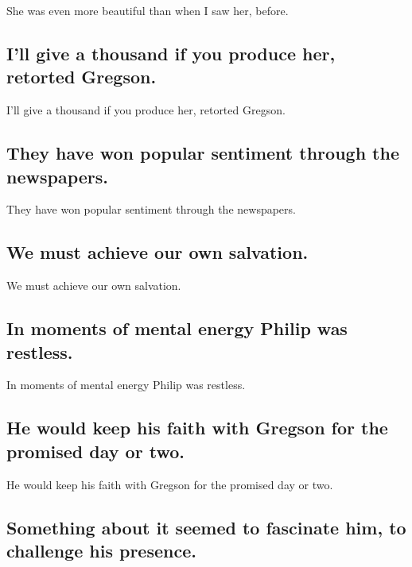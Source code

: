 \documentclass[]{article}
\begin{document}
She was even more beautiful than when I saw her, before.

\hypertarget{ill-give-a-thousand-if-you-produce-her-retorted-gregson.}{%
\subsection{I'll give a thousand if you produce her, retorted
Gregson.}\label{ill-give-a-thousand-if-you-produce-her-retorted-gregson.}}

I'll give a thousand if you produce her, retorted Gregson.

\hypertarget{they-have-won-popular-sentiment-through-the-newspapers.}{%
\subsection{They have won popular sentiment through the
newspapers.}\label{they-have-won-popular-sentiment-through-the-newspapers.}}

They have won popular sentiment through the newspapers.

\hypertarget{we-must-achieve-our-own-salvation.}{%
\subsection{We must achieve our own
salvation.}\label{we-must-achieve-our-own-salvation.}}

We must achieve our own salvation.

\hypertarget{in-moments-of-mental-energy-philip-was-restless.}{%
\subsection{In moments of mental energy Philip was
restless.}\label{in-moments-of-mental-energy-philip-was-restless.}}

In moments of mental energy Philip was restless.

\hypertarget{he-would-keep-his-faith-with-gregson-for-the-promised-day-or-two.}{%
\subsection{He would keep his faith with Gregson for the promised day or
two.}\label{he-would-keep-his-faith-with-gregson-for-the-promised-day-or-two.}}

He would keep his faith with Gregson for the promised day or two.

\hypertarget{something-about-it-seemed-to-fascinate-him-to-challenge-his-presence.}{%
\subsection{Something about it seemed to fascinate him, to challenge his
presence.}\label{something-about-it-seemed-to-fascinate-him-to-challenge-his-presence.}}
\end{document}
